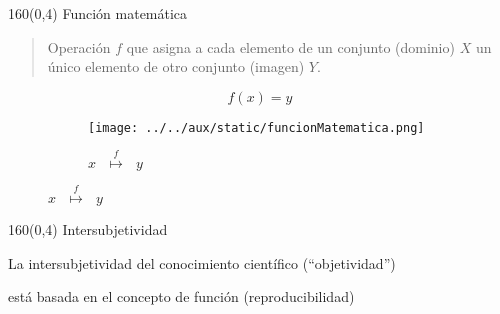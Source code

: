 \documentclass[shownotes,aspectratio=169]{beamer}
\begin{document}
\begin{frame}[plain]
\begin{textblock}{160}(0,4)
 \centering \LARGE Función matemática
\end{textblock}
\vspace{1.25cm}
 
\begin{quote}
 Operación $f$ que asigna a cada elemento de un conjunto (dominio) $X$
un único elemento de otro conjunto (imagen) $Y$.
\end{quote}

\begin{equation}
 f(x)=y
\end{equation}

\pause

 \begin{figure}[H]
    \centering
    \begin{subfigure}[t]{0.3\textwidth}
      \texttt{[image: ../../aux/static/funcionMatematica.png]}
            \caption*{$x \ \ \  \overset{f}{\longmapsto} \ \ \  y $}
    \end{subfigure}
\end{figure}
 
\end{frame}

\begin{frame}[plain]
\begin{textblock}{160}(0,4)
 \centering \LARGE Intersubjetividad
\end{textblock}
\vspace{0.75cm}


 \begin{center} \Large
 La intersubjetividad del conocimiento científico (``objetividad'')
 
 está basada en el concepto de función (reproducibilidad)
 \end{center}
 
 
\end{frame}
\end{document}
